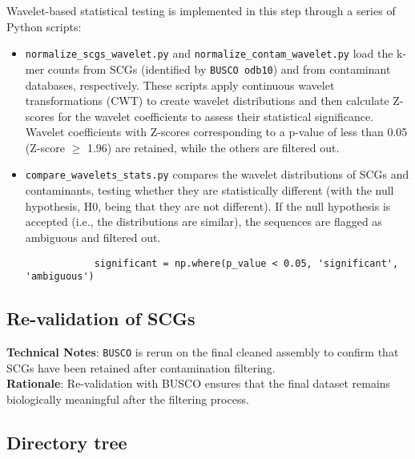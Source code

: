 \documentclass[11pt]{report}
\begin{document}
{\begin{tcolorbox}[coltitle=white, title=Personal Notes]
	Wavelet-based statistical testing is implemented in this step through a series of Python scripts:
	\begin{itemize}
		\item \texttt{normalize\_scgs\_wavelet.py} and \texttt{normalize\_contam\_wavelet.py} load the k-mer counts from SCGs (identified by \texttt{BUSCO odb10}) and from contaminant databases, respectively. These scripts apply continuous wavelet transformations (CWT) to create wavelet distributions and then calculate Z-scores for the wavelet coefficients to assess their statistical significance. Wavelet coefficients with Z-scores corresponding to a p-value of less than 0.05 (Z-score $\geq$ 1.96) are retained, while the others are filtered out.
		\item \texttt{compare\_wavelets\_stats.py} compares the wavelet distributions of SCGs and contaminants, testing whether they are statistically different (with the null hypothesis, H0, being that they are not different). If the null hypothesis is accepted (i.e., the distributions are similar), the sequences are flagged as ambiguous and filtered out.
		\begin{verbatim}
			significant = np.where(p_value < 0.05, 'significant', 'ambiguous')
		\end{verbatim}
	\end{itemize}
\end{tcolorbox}


\subsection{Re-validation of SCGs} \textbf{Technical Notes}: \texttt{BUSCO} is rerun on the final cleaned assembly to confirm that SCGs have been retained after contamination filtering. \\
\textbf{Rationale}: Re-validation with BUSCO ensures that the final dataset remains biologically meaningful after the filtering process.
	



\subsection{Directory tree}

}
\end{document}
